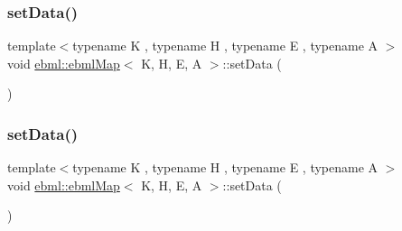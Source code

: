 \mbox{\label{classebml_1_1ebmlMap_ac0f6f02863ae22a4c9c6b7fdf9a3f635}} 
\subsubsection{\texorpdfstring{set\+Data()}{setData()}\hspace{0.1cm}{\footnotesize\ttfamily [9/11]}}
{\footnotesize\ttfamily template$<$typename K , typename H , typename E , typename A $>$ \\
void \mbox{\hyperlink{classebml_1_1ebmlMap}{ebml\+::ebml\+Map}}$<$ K, H, E, A $>$\+::set\+Data (\begin{DoxyParamCaption}\item[{std\+::list$<$ std\+::pair$<$ K, \mbox{\hyperlink{namespaceebml_adad533b7705a16bb360fe56380c5e7be}{ebml\+Element\+\_\+sp}} $>$$>$ \&\&}]{ }\end{DoxyParamCaption})}

\mbox{\label{classebml_1_1ebmlMap_a44f4a7d1c8cc2b05be540e70e61cfad3}} 
\subsubsection{\texorpdfstring{set\+Data()}{setData()}\hspace{0.1cm}{\footnotesize\ttfamily [10/11]}}
{\footnotesize\ttfamily template$<$typename K , typename H , typename E , typename A $>$ \\
void \mbox{\hyperlink{classebml_1_1ebmlMap}{ebml\+::ebml\+Map}}$<$ K, H, E, A $>$\+::set\+Data (\begin{DoxyParamCaption}\item[{const std\+::unordered\+\_\+map$<$ K, \mbox{\hyperlink{namespaceebml_adad533b7705a16bb360fe56380c5e7be}{ebml\+Element\+\_\+sp}}, H, E, A $>$ \&}]{ }\end{DoxyParamCaption})}

\mbox{\label{classebml_1_1ebmlMap_a04ad9f91a20cd5c32ca169fc1e6e141c}} 
